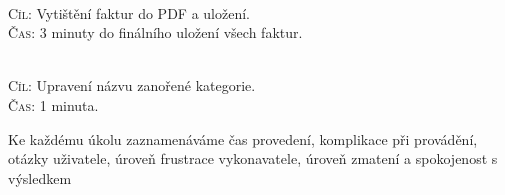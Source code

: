 \documentclass[11pt,a4paper]{article}
\begin{document}
\\
\textsc{Cíl}: Vytištění faktur do PDF a uložení.\\
\textsc{Čas}: 3 minuty do finálního uložení všech faktur.\\
\bigskip

\\
\textsc{Cíl}: Upravení názvu zanořené kategorie.\\
\textsc{Čas}: 1 minuta.\\
\bigskip

\noindent Ke každému úkolu zaznamenáváme čas provedení, komplikace při provádění, otázky uživatele, úroveň frustrace vykonavatele, úroveň zmatení a spokojenost s výsledkem
\end{document}
